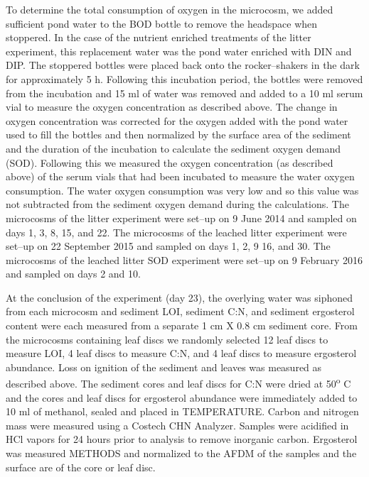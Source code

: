 To determine the total consumption of oxygen in the microcosm, we added sufficient pond water to the BOD bottle to remove the headspace when stoppered. In the case of the nutrient enriched treatments of the litter experiment, this replacement water was the pond water enriched with DIN and DIP. The stoppered bottles were placed back onto the rocker--shakers in the dark for approximately 5 h. Following this incubation period, the bottles were removed from the incubation and 15 ml of water was removed and added to a 10 ml serum vial to measure the oxygen concentration as described above. The change in oxygen concentration was corrected for the oxygen added with the pond water used to fill the bottles and then normalized by the surface area of the sediment and the duration of the incubation to calculate the sediment oxygen demand (SOD). Following this we measured the oxygen concentration (as described above) of the serum vials that had been incubated to measure the water oxygen consumption. The water oxygen consumption was very low and so this value was not subtracted from the sediment oxygen demand during the calculations. The microcosms of the litter experiment were set--up on 9 June 2014 and sampled on days 1, 3, 8, 15, and 22. The microcosms of the leached litter experiment were set--up on 22 September 2015 and sampled on days 1, 2, 9 16, and 30. The microcosms of the leached litter SOD experiment were set--up on 9 February 2016 and sampled on days 2 and 10.
 
At the conclusion of the experiment (day 23), the overlying water was siphoned from each microcosm and sediment LOI, sediment C:N, and sediment ergosterol content were each measured from a separate 1 cm X 0.8 cm sediment core.  From the microcosms containing leaf discs we randomly selected 12 leaf discs to measure LOI, 4 leaf discs to measure C:N, and 4 leaf discs to measure ergosterol abundance. Loss on ignition of the sediment and leaves was measured as described above. The sediment cores and leaf discs for C:N were dried at 50\textsuperscript{o} C and the cores and leaf discs for ergosterol abundance were immediately added to 10 ml of methanol, sealed and placed in TEMPERATURE. Carbon and nitrogen mass were measured using a Costech CHN Analyzer. Samples were acidified in HCl vapors for 24 hours prior to analysis to remove inorganic carbon.  Ergosterol was measured METHODS and normalized to the AFDM of the samples and the surface are of the core or leaf disc.  